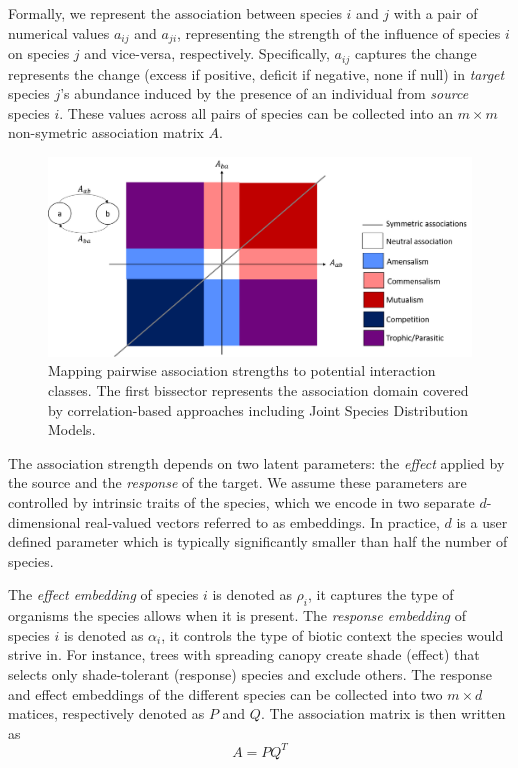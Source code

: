 \documentclass[]{article}
\newcommand{\commG}[1]{#1}
\newcommand{\spc}{i}
\newcommand{\ospc}{j}
\newcommand{\AssMat}{A}
\newcommand{\EffMat}{Q}
\newcommand{\ResMat}{P}
\begin{document}
Formally, we represent the association between species $\spc$ and
$\ospc$ with a pair of numerical values $a_{\spc\ospc}$ and
$a_{\ospc\spc}$, representing the strength of the influence of species
$\spc$ on species $\ospc$ and vice-versa, respectively. Specifically,
$a_{\spc\ospc}$ captures the change represents the change (excess if
positive, deficit if negative, none if null) in \textit{target}
species $\ospc$'s abundance induced by the presence of an individual
from \textit{source} species $\spc$.  These values across all pairs of
species can be collected into an $m \times m$ non-symetric association
matrix $\AssMat$.

\begin{figure}[h]
	\centering
	\commG{\includegraphics[scale=0.4]{assoc_classif}}
	\caption{Mapping pairwise association strengths to potential interaction classes. The first bissector represents the association domain covered by correlation-based approaches including Joint Species Distribution Models. }
	\label{assocdomain}
\end{figure}

The association strength depends on two latent parameters: the \textit{effect} applied by the source and the \textit{response} of the target. We assume these parameters are controlled by intrinsic traits of the species, which we encode in two separate $d$-dimensional real-valued vectors referred to as embeddings.
In practice, $d$ is a user defined parameter which is typically significantly smaller than half the number of species.

The \emph{effect embedding} of species $\spc$ is denoted as $\rho_\spc$, it captures the type of organisms the species allows when it is present. The \emph{response embedding} of species $\spc$ is denoted as $\alpha_\spc$, it controls the type of biotic context the species would strive in. For instance, trees with spreading canopy create shade (effect) that selects only shade-tolerant (response) species and exclude others.  
The response and effect embeddings of the different species can be collected into two $m\times d$ matices, respectively denoted as $\ResMat$ and $\EffMat$.
The association matrix is then written as
\begin{equation*}
	\AssMat = \ResMat\EffMat^{T}
\end{equation*}
\end{document}
